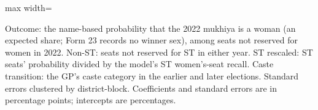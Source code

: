 \begin{adjustbox}{max width=\linewidth}
\begin{threeparttable}[b]
      \begin{tablenotes}
         \item Outcome: the name-based probability that the 2022 mukhiya is a woman (an expected share; Form 23 records no winner sex), among seats not reserved for women in 2022. Non-ST: seats not reserved for ST in either year. ST rescaled: ST seats' probability divided by the model's ST women's-seat recall. Caste transition: the GP's caste category in the earlier and later elections. Standard errors clustered by district-block. Coefficients and standard errors are in percentage points; intercepts are percentages.
      \end{tablenotes}
   \end{threeparttable}
\end{adjustbox}
\par\endgroup


